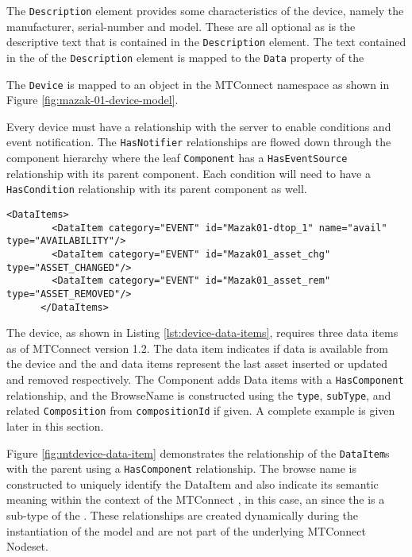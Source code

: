 The \texttt{Description} element provides some characteristics of the device, namely the manufacturer, serial-number and model. These are all optional as is the descriptive text that is contained in the \texttt{Description} element. The text contained in the  of the \texttt{Description} element is mapped to the \texttt{Data} property of the 

The \texttt{Device} is mapped to an  object in the MTConnect namespace as shown in Figure \ref{fig:mazak-01-device-model}.



Every device must have a  relationship with the server to enable conditions and event notification. The \texttt{HasNotifier} relationships are flowed down through the component hierarchy where the leaf \texttt{Component} has a \texttt{HasEventSource} relationship with its parent component. Each condition will need to have a \texttt{HasCondition} relationship with its parent component as well. 

\begin{lstlisting}[firstnumber=last,%
    caption={Device Data Items},label={lst:device-data-items}]
      <DataItems>
        <DataItem category="EVENT" id="Mazak01-dtop_1" name="avail" type="AVAILABILITY"/>
        <DataItem category="EVENT" id="Mazak01_asset_chg" type="ASSET_CHANGED"/>
        <DataItem category="EVENT" id="Mazak01_asset_rem" type="ASSET_REMOVED"/>
      </DataItems>
\end{lstlisting}

The device, as shown in Listing \ref{lst:device-data-items}, requires three data items as of MTConnect version 1.2. The  data item indicates if data is available from the device and the  and  data items represent the last asset inserted or updated and removed respectively. The Component adds Data items with a \texttt{Has\-Component} relationship, and the BrowseName is constructed using the \texttt{type}, \texttt{sub\-Type}, and related \texttt{Composition} from \texttt{compositionId} if given. A complete example is given later in this section.



Figure \ref{fig:mtdevice-data-item} demonstrates the relationship of the \texttt{Data\-Item}s with the parent  using a \texttt{Has\-Component} relationship. The browse name is constructed to uniquely identify the DataItem and also indicate its semantic meaning within the context of the MTConnect , in this case, an  since the  is a sub-type of the . These relationships are created dynamically during the instantiation of the model and are not part of the underlying MTConnect Nodeset.

